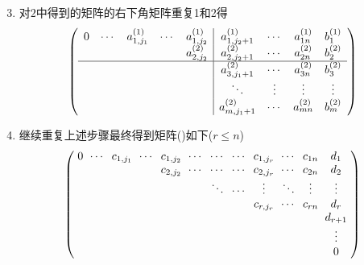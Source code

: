 \begin{frame}
\begin{enumerate}\setcounter{enumi}{2}
\item 对$2$中得到的矩阵的右下角矩阵重复1和2得
{\small	\begin{equation*}
\left(\begin{array}{ccccc|ccccc}
0 & \cdots  & a_{1,j_1}^{(1)} & \cdots & a_{1,j_2}^{(1)} & a_{1,j_2+1}^{(1)} & \cdots & a_{1n}^{(1)} & b_{1}^{(1)} \\
&  &  &  & a_{2,j_2}^{(2)}& a_{2,j_2+1}^{(2)} & \cdots & a_{2n}^{(2)} & b_{2}^{(2)} \\ \hline
& & && & a_{3,j_1+1}^{(2)} & \cdots & a_{3n}^{(2)} & b_{3}^{(2)} \\
& & & & &\ddots &\vdots &\vdots&\vdots \\
& & & & & a_{m,j_1+1}^{(2)} & \cdots & a_{mn}^{(2)} & b_{m}^{(2)} \\
\end{array}\right)
\end{equation*}} \pp
\item 继续重复上述步骤最终得到矩阵()如下($r\leq n$)
{\small	\begin{equation*}
\setlength{\arraycolsep}{3pt}
\left(\begin{array}{cccccccccccc}
0 & \cdots  & c_{1,j_1} & \cdots  & c_{1,j_2} & \cdots &\cdots &\cdots & c_{1,j_r} &\cdots & c_{1n} & d_{1} \\
&  &  & & c_{2,j_2}& \cdots &\cdots &\cdots  & c_{2,j_r} & \cdots & c_{2n} & d_{2} \\
&  & &  && &\ddots&\cdots &\vdots &\ddots &\vdots &\vdots \\
& & &  & && &  & c_{r,j_r} &\cdots& c_{rn} & d_r \\
&  & &  &  &&&  &  &&  & d_{r+1} \\
&&&&&&&&&&&\vdots \\
&&&&&&&&&&&0 \\
\end{array}\right)
\end{equation*}
}
\end{enumerate}
\end{frame}





